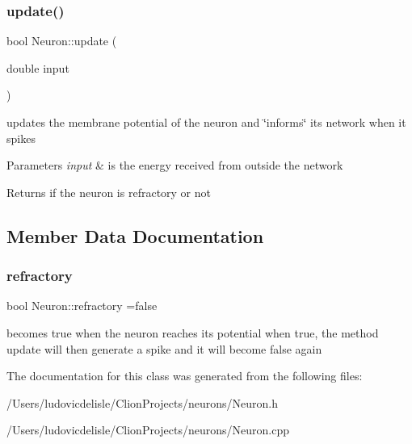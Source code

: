 \subsubsection{\texorpdfstring{update()}{update()}}
{\footnotesize\ttfamily bool Neuron\+::update (\begin{DoxyParamCaption}\item[{double}]{input }\end{DoxyParamCaption})}

updates the membrane potential of the neuron and \char`\"{}informs\char`\"{} its network when it spikes 
\begin{DoxyParams}{Parameters}
{\em input} & is the energy received from outside the network \\
\hline
\end{DoxyParams}
\begin{DoxyReturn}{Returns}
if the neuron is refractory or not 
\end{DoxyReturn}


\subsection{Member Data Documentation}
\mbox{\label{class_neuron_aa8becbf43a8a371a89d00ebf9c79ff88}} 
\subsubsection{\texorpdfstring{refractory}{refractory}}
{\footnotesize\ttfamily bool Neuron\+::refractory =false\hspace{0.3cm}{\ttfamily [private]}}

becomes true when the neuron reaches it\textquotesingle{}s potential when true, the method update will then generate a spike and it will become false again 

The documentation for this class was generated from the following files\+:\begin{DoxyCompactItemize}
\item 
/\+Users/ludovicdelisle/\+Clion\+Projects/neurons/Neuron.\+h\item 
/\+Users/ludovicdelisle/\+Clion\+Projects/neurons/Neuron.\+cpp\end{DoxyCompactItemize}
